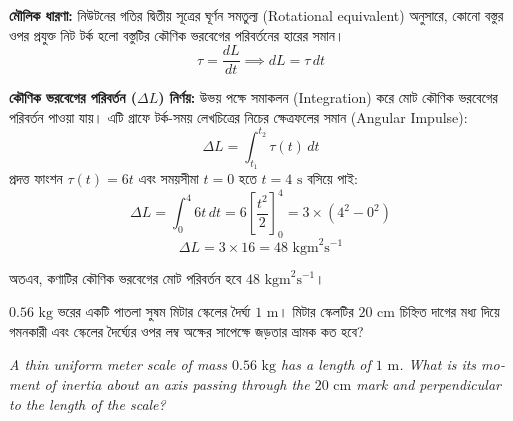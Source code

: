\documentclass[12pt, a4paper]{article}
\begin{document}
{%
\begin{tcolorbox}[solutionbox={সমাধান (Solution)}]
\noindent
\textbf{মৌলিক ধারণা:}
নিউটনের গতির দ্বিতীয় সূত্রের ঘূর্ণন সমতুল্য (Rotational equivalent) অনুসারে, কোনো বস্তুর ওপর প্রযুক্ত নিট টর্ক হলো বস্তুটির কৌণিক ভরবেগের পরিবর্তনের হারের সমান।
$$\tau = \frac{dL}{dt} \implies dL = \tau \, dt$$

\vspace{0.5em}
\textbf{কৌণিক ভরবেগের পরিবর্তন ($\Delta L$) নির্ণয়:}
উভয় পক্ষে সমাকলন (Integration) করে মোট কৌণিক ভরবেগের পরিবর্তন পাওয়া যায়। এটি গ্রাফে টর্ক-সময় লেখচিত্রের নিচের ক্ষেত্রফলের সমান (Angular Impulse):
$$\Delta L = \int_{t_1}^{t_2} \tau(t) \, dt$$
প্রদত্ত ফাংশন $\tau(t) = 6t$ এবং সময়সীমা $t = 0$ হতে $t = 4\text{ s}$ বসিয়ে পাই:
$$\Delta L = \int_0^4 6t \, dt = 6 \left[ \frac{t^2}{2} \right]_0^4 = 3 \times (4^2 - 0^2)$$
$$\Delta L = 3 \times 16 = 48\text{ kgm}^2\text{s}^{-1}$$

অতএব, কণাটির কৌণিক ভরবেগের মোট পরিবর্তন হবে $48\text{ kgm}^2\text{s}^{-1}$।
\end{tcolorbox}
\vspace{1em}


\begin{tcolorbox}[questionbox={প্রশ্ন (Question) 26}]
\noindent
$0.56\text{ kg}$ ভরের একটি পাতলা সুষম মিটার স্কেলের দৈর্ঘ্য $1\text{ m}$। মিটার স্কেলটির $20\text{ cm}$ চিহ্নিত দাগের মধ্য দিয়ে গমনকারী এবং স্কেলের দৈর্ঘ্যের ওপর লম্ব অক্ষের সাপেক্ষে জড়তার ভ্রামক কত হবে?

\vspace{0.8em}
\begin{english}
\noindent\textit{\color{darkgray}
A thin uniform meter scale of mass $0.56\text{ kg}$ has a length of $1\text{ m}$. What is its moment of inertia about an axis passing through the $20\text{ cm}$ mark and perpendicular to the length of the scale?
}
\end{english}
\end{tcolorbox}

\vspace{1em}
\begin{center}
\end{center}}
\end{document}
